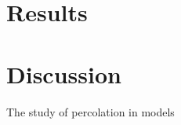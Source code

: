 \documentclass{article}
\begin{document}
\begin{figure}
  
\end{figure}

\begin{figure}
  
\end{figure}

\begin{figure}
  
\end{figure}

\begin{figure}
  \resizebox{1.3\textwidth}{!}{}
\end{figure}

\begin{figure}
  \resizebox{1.3\textwidth}{!}{}
\end{figure}

\begin{figure}
  \resizebox{1.3\textwidth}{!}{}
\end{figure}


\section{Results}


\section{Discussion}

The study of percolation in models
\end{document}
